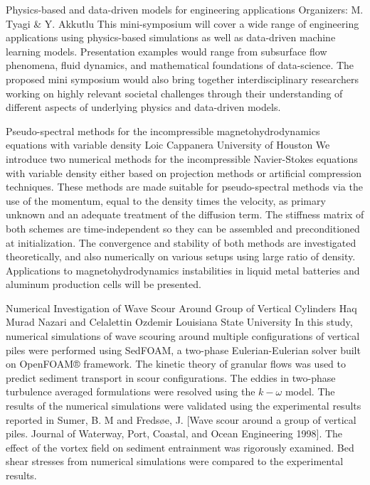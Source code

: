 \label{mini06}

\miniabs
{Physics-based and data-driven models for engineering applications}
{Organizers: M. Tyagi \& Y. Akkutlu}
{This mini-symposium will cover a wide range of engineering applications using physics-based simulations as well as data-driven machine learning models. Presentation examples would range from subsurface flow phenomena, fluid dynamics, and mathematical foundations of data-science. The proposed mini symposium would also bring together interdisciplinary researchers working on highly relevant societal challenges through their understanding of different aspects of underlying physics and data-driven models.}
\vspace{2ex}


\begin{addmargin}[2em]{0em}

\abs
{Pseudo-spectral methods for the incompressible magnetohydrodynamics equations with variable density}
{Loic Cappanera}
{University of Houston}
{We introduce two numerical methods for the incompressible Navier-Stokes equations with variable density either based on projection methods or artificial compression techniques. These methods are made suitable for pseudo-spectral methods via the use of the momentum, equal to the density times the velocity, as primary unknown and an adequate treatment of the diffusion term. The stiffness matrix of both schemes are time-independent so they can be assembled and preconditioned at initialization. The convergence and stability of both methods are investigated theoretically, and also numerically on various setups using large ratio of density. Applications to magnetohydrodynamics instabilities in liquid metal batteries and aluminum production cells will be presented.}

\vspace{1.5ex}
\abs
{Numerical Investigation of Wave Scour Around Group of Vertical Cylinders }
{Haq Murad Nazari and  Celalettin Ozdemir}
{Louisiana State University}
{In this study, numerical simulations of wave scouring around multiple configurations of vertical piles were performed using SedFOAM, a two-phase Eulerian-Eulerian solver built on OpenFOAM® framework. The kinetic theory of granular flows was used to predict sediment transport in scour configurations. The eddies in two-phase turbulence averaged formulations were resolved using the $k-\omega$ model. The results of the numerical simulations were validated using the experimental results reported in Sumer, B. M and Fredsøe, J. [Wave scour around a group of vertical piles. Journal of Waterway, Port, Coastal, and Ocean Engineering 1998]. The effect of the vortex field on sediment entrainment was rigorously examined. Bed shear stresses from numerical simulations were compared to the experimental results. }


\end{addmargin}
